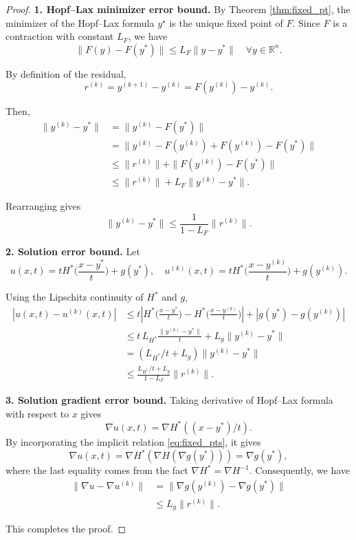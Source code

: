 \documentclass[10pt,a4paper]{amsart}
\begin{document}
\begin{proof}
\textbf{1. Hopf--Lax minimizer error bound.} 
  By Theorem \ref{thm:fixed_pt}, the minimizer of the Hopf--Lax formula $y^\star$ is the unique fixed point of \(F\).
Since \(F\) is a contraction with constant \(L_F\), we have
\[
\|F(y) - F(y^*)\| \le L_F \|y - y^*\| \quad \forall y \in \mathbb{R}^n.
\]

By definition of the residual,
\[
r^{(k)} = y^{(k+1)} - y^{(k)} = F(y^{(k)}) - y^{(k)}.
\]

Then,
\[
\begin{aligned}
\|y^{(k)} - y^*\| 
&= \|y^{(k)} - F(y^*)\| \\
&= \|y^{(k)} - F(y^{(k)}) + F(y^{(k)}) - F(y^*)\| \\
&\le \|r^{(k)}\| + \|F(y^{(k)}) - F(y^*)\| \\
&\le \|r^{(k)}\| + L_F \|y^{(k)} - y^*\|.
\end{aligned}
\]

Rearranging gives
\[
\|y^{(k)} - y^*\| \le \frac{1}{1 - L_F} \|r^{(k)}\|.
\]

\medskip
\textbf{2. Solution error bound.}  
Let
\[
u(x,t) = t H^*\Big(\frac{x - y^*}{t}\Big) + g(y^*), \quad u^{(k)}(x,t) = t H^*\Big(\frac{x - y^{(k)}}{t}\Big) + g(y^{(k)}).
\]

Using the Lipschitz continuity of \(H^*\) and \(g\),
\[
\begin{aligned}
|u(x,t) - u^{(k)}(x,t)| 
&\le t \left|H^*\Big(\frac{x - y^*}{t}\Big) - H^*\Big(\frac{x - y^{(k)}}{t}\Big)\right| + |g(y^*) - g(y^{(k)})| \\
&\le t \, L_{H^*} \frac{\|y^{(k)} - y^*\|}{t} + L_g \|y^{(k)} - y^*\| \\
&= (L_{H^*}/t + L_g) \|y^{(k)} - y^*\| \\
&\le \frac{L_{H^*}/t + L_g}{1 - L_F} \|r^{(k)}\|.
\end{aligned}
\]

\medskip
\textbf{3. Solution gradient error bound.}  
Taking derivative of Hopf--Lax formula with respect to $x$ gives
\[\nabla u(x,t) = \nabla H^*((x - y^*)/t).
\] 
By incorporating the implicit relation \eqref{eq:fixed_pts}, it
gives
\[\nabla u(x,t) = \nabla H^*(\nabla H(\nabla g(y^\ast)))=\nabla g(y^\ast),
\] 
where the last equality comes from the fact $ \nabla H^*=\nabla H^{-1}$.
Consequently, we have
\[
\begin{aligned}
\|\nabla u - \nabla u^{(k)}\| 
&= \Big\|\nabla g(y^{(k)}) - \nabla g(y^\ast)\Big\| \\
&\le L_g\| r^{(k)} \|.
\end{aligned}
\]

This completes the proof.
\end{proof}
\end{document}
